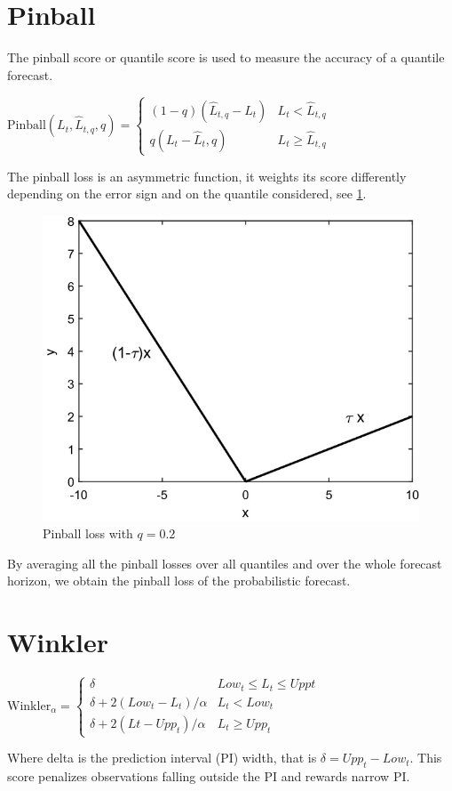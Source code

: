\section{Pinball}\label{pinball}
The pinball score or quantile score is used to measure the accuracy of a quantile forecast.
\begin{definition}
    $\mathrm{Pinball}(L_{t},\hat{L}_{t,q},q)=
\begin{cases}
(1-q)(\hat{L}_{t,q}-L_{t}) & L_t < \hat{L}_{t,q} \\
q(L_t-\hat{L}_t,q) & L_t \geq \hat{L}_{t,q}
\end{cases}$
\end{definition}
The pinball loss is an asymmetric function, it weights its score differently depending on the error sign and on the quantile considered, see \ref{fig:pinball}.
\begin{figure}
    \includegraphics[width=\textwidth]{images/pinball_loos.png}
    \caption{Pinball loss with $q=0.2$ \cite{haben2023core}}
    \label{fig:pinball}
  \end{figure}
By averaging all the pinball losses over all quantiles and over the whole forecast horizon, we obtain the pinball loss of the probabilistic forecast.
\section{Winkler}
\begin{definition}
    $\mathrm{Winkler}_{\alpha}=\begin{cases}
        \delta & Low_{t}\leq L_{t}\leq Upp{t}\\
        \delta+2(Low_{t}-L_{t})/\alpha & L_{t}<Low_{t}\\
        \delta+2(L{t}-Upp_{t})/\alpha & L_{t} \geq Upp_{t}
    \end{cases}$
\end{definition}
Where delta is the prediction interval (PI) width, that is $\delta=Upp_t-Low_t$. This score penalizes observations falling outside the PI and rewards narrow PI.
